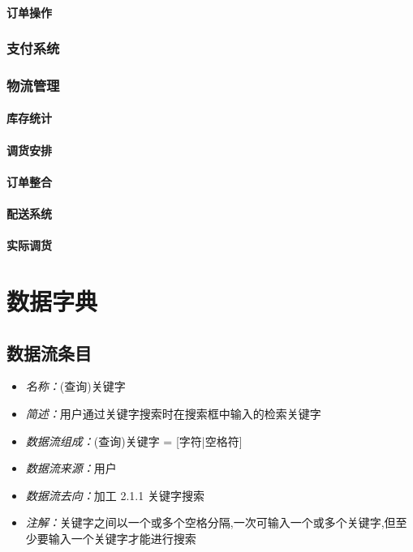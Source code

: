\paragraph{订单操作}
\subsubsection{支付系统}
\subsubsection{物流管理}
\paragraph{库存统计}
\paragraph{调货安排}
\paragraph{订单整合}
\paragraph{配送系统}
\paragraph{实际调货}
\section{数据字典}
\subsection{数据流条目}

\begin{itemize}
	\item \textit{名称：}(查询)关键字
	\item \textit{简述：}用户通过关键字搜索时在搜索框中输入的检索关键字
	\item \textit{数据流组成：}(查询)关键字 = [字符|空格符]
	\item \textit{数据流来源：}用户
	\item \textit{数据流去向：}加工 2.1.1 关键字搜索
	\item \textit{注解：}关键字之间以一个或多个空格分隔,一次可输入一个或多个关键字,但至少要输入一个关键字才能进行搜索
\end{itemize}

